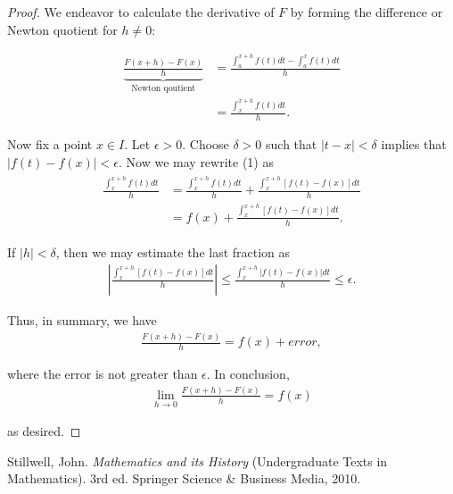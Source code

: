 \documentclass{article}
\begin{document}
\begin{proof}
We endeavor to calculate the derivative of $F$ by forming the difference or Newton quotient for $h \neq 0$:

\begin{align*}
  \underbrace{\frac{F(x+h) - F(x)}{h}}_{\textrm{Newton qoutient}} &= \frac{\int^{x+h}_{a} f(t)dt - \int^x_a f(t)dt }{h} \\
   &= \frac{\int^{x+h}_{x} f(t)dt}{h}. \tag{1}
  \end{align*}

Now fix a point $x \in I.$ Let $\epsilon > 0.$ Choose $\delta > 0$ such that $|t - x| < \delta$ implies that 
$|f(t) - f(x)| < \epsilon.$ Now we may rewrite (1) as 
\begin{align*}
  \begin{split}
  \frac{\int^{x+h}_x f(t)dt}{h} &= \frac{\int^{x+h}_x f(t)dt}{h} + \frac{\int^{x+h}_x [f(t) - f(x)] dt }{h} \\
   &= f(x) + \frac{\int^{x+h}_x [f(t) - f(x)]dt}{h}.
  \end{split}
\end{align*}

If $|h| < \delta$, then we may estimate the last fraction as
\begin{align*}
    \left| \frac{\int^{x+h}_x [f(t) - f(x)]dt}{h} \right| \leq \frac{\int^{x+h}_x |f(t) - f(x)|dt}{h} \leq \epsilon.
\end{align*}

Thus, in summary, we have
\begin{align*}
    \frac{F(x+h) - F(x)}{h} = f(x) + error,
\end{align*}

where the error is not greater than $\epsilon$. In conclusion,
\begin{align*}
    \lim_{h \rightarrow 0}  \frac{F(x+h) - F(x)}{h} = f(x)
\end{align*}

as desired. 

\end{proof}


\begin{thebibliography}{9}
Stillwell, John.
\textit{Mathematics and its History} (Undergraduate Texts in Mathematics). 
 3rd ed. Springer Science \& Business Media, 2010.
\end{thebibliography}
\end{document}
